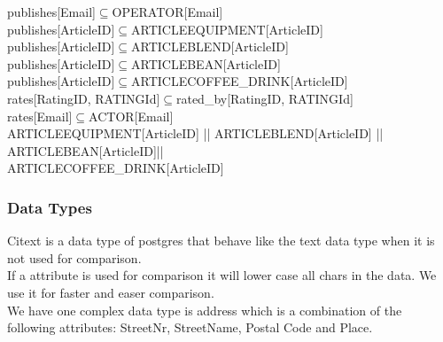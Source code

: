 publishes[Email]$\subseteq$OPERATOR[Email]\\
publishes[ArticleID]$\subseteq$ARTICLEEQUIPMENT[ArticleID]\\
publishes[ArticleID]$\subseteq$ARTICLEBLEND[ArticleID]\\
publishes[ArticleID]$\subseteq$ARTICLEBEAN[ArticleID]\\
publishes[ArticleID]$\subseteq$ARTICLECOFFEE\_DRINK[ArticleID]\\
rates[RatingID, RATINGId]$\subseteq$rated\_by[RatingID, RATINGId]\\
rates[Email]$\subseteq$ACTOR[Email]\\
ARTICLEEQUIPMENT[ArticleID] || ARTICLEBLEND[ArticleID] || ARTICLEBEAN[ArticleID]|| \\
ARTICLECOFFEE\_DRINK[ArticleID]\\
\subsubsection{Data Types}
Citext is a data type of postgres that behave like the text data type when it is not used for comparison.\\
If a attribute is used for comparison it will lower case all chars in the data.
We use it for faster and easer comparison.\\
We have one complex data type is address which is a combination of the following attributes: StreetNr, StreetName, Postal Code and Place.\\\\

